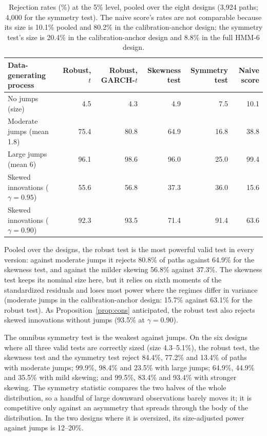 \documentclass[11pt,a4paper]{article}
\theoremstyle{definition}
\theoremstyle{remark}
\begin{document}
\begin{table}[ht]\centering\footnotesize\setlength{\tabcolsep}{4pt}
\caption{Rejection rates (\%) at the 5\% level, pooled over the eight designs (3{,}924 paths; 4{,}000 for the symmetry test). The naive score's rates are not comparable because its size is 10.1\% pooled and 80.2\% in the calibration-anchor design; the symmetry test's size is 20.4\% in the calibration-anchor design and 8.8\% in the full HMM-6 design.}\label{tab:b12}
\begin{tabular}{lrrrrr}
\toprule
Data-generating process & Robust, $t$ & Robust, GARCH-$t$ & Skewness test & Symmetry test & Naive score\\
\midrule
No jumps (size) & 4.5 & 4.3 & 4.9 & 7.5 & 10.1\\
Moderate jumps (mean 1.8) & 75.4 & 80.8 & 64.9 & 16.8 & 38.8\\
Large jumps (mean 6) & 96.1 & 98.6 & 96.0 & 25.0 & 99.4\\
Skewed innovations ($\gamma=0.95$) & 55.6 & 56.8 & 37.3 & 36.0 & 15.6\\
Skewed innovations ($\gamma=0.90$) & 92.3 & 93.5 & 71.4 & 91.4 & 63.6\\
\bottomrule
\end{tabular}
\end{table}

Pooled over the designs, the robust test is the most powerful valid test in every version: against moderate jumps it rejects 80.8\% of paths against 64.9\% for the skewness test, and against the milder skewing 56.8\% against 37.3\%. The skewness test keeps its nominal size here, but it relies on sixth moments of the standardized residuals and loses most power where the regimes differ in variance (moderate jumps in the calibration-anchor design: 15.7\% against 63.1\% for the robust test). As Proposition~\ref{prop:cons} anticipated, the robust test also rejects skewed innovations without jumps (93.5\% at $\gamma=0.90$).

The omnibus symmetry test is the weakest against jumps. On the six designs where all three valid tests are correctly sized (size 4.3--5.1\%), the robust test, the skewness test and the symmetry test reject 84.4\%, 77.2\% and 13.4\% of paths with moderate jumps; 99.9\%, 98.4\% and 23.5\% with large jumps; 64.9\%, 44.9\% and 35.5\% with mild skewing; and 99.5\%, 83.4\% and 93.4\% with stronger skewing. The symmetry statistic compares the two halves of the whole distribution, so a handful of large downward observations barely moves it; it is competitive only against an asymmetry that spreads through the body of the distribution. In the two designs where it is oversized, its size-adjusted power against jumps is 12--20\%.
\end{document}
